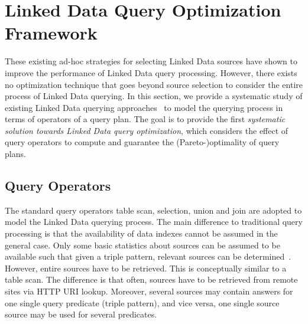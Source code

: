 \section{Linked Data Query Optimization Framework}
\label{sec:framework}
These existing ad-hoc strategies for selecting Linked Data sources have shown to improve the performance of Linked Data query processing. However, there exists no optimization technique that goes beyond source selection to consider the entire process of Linked Data querying. In this section, we provide a systematic study of existing Linked Data querying approaches~\cite{hartig_executing_2009,harth_data_2010,ladwig_linked_2010} to model the querying process in terms of operators of a query plan. The goal is to provide the first \emph{systematic solution towards Linked Data query optimization}, which considers the effect of query operators to compute and guarantee the (Pareto-)optimality of query plans. 


\subsection{Query Operators}
\label{sec:ops}
The standard query operators table scan, selection, union and join are adopted to model the Linked Data querying process. The main difference to traditional query processing is that the availability of data indexes cannot be assumed in the general case. Only some basic statistics about sources can be assumed to be available such that given a triple pattern, relevant sources can be determined~\cite{harth_data_2010,ladwig_linked_2010}. However, entire sources have to be retrieved. This is conceptually similar to a table scan. The difference is that often, sources have to be retrieved from remote sites via HTTP URI lookup. Moreover, several sources may contain answers for one single query predicate (triple pattern), and vice versa, one single source source may be used for several predicates.  

